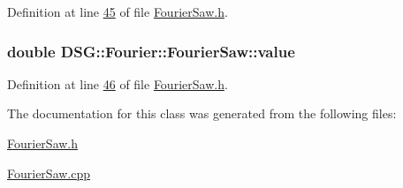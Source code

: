 Definition at line \hyperlink{_fourier_saw_8h_source_l00045}{45} of file \hyperlink{_fourier_saw_8h_source}{Fourier\+Saw.\+h}.

\hypertarget{class_d_s_g_1_1_fourier_1_1_fourier_saw_a97d69a0c03cfb66b1cf6e13fe7073c12}{
\subsubsection[{value}]{\setlength{\rightskip}{0pt plus 5cm}double D\+S\+G\+::\+Fourier\+::\+Fourier\+Saw\+::value\hspace{0.3cm}{\ttfamily [protected]}}}\label{class_d_s_g_1_1_fourier_1_1_fourier_saw_a97d69a0c03cfb66b1cf6e13fe7073c12}


Definition at line \hyperlink{_fourier_saw_8h_source_l00046}{46} of file \hyperlink{_fourier_saw_8h_source}{Fourier\+Saw.\+h}.



The documentation for this class was generated from the following files\+:\begin{DoxyCompactItemize}
\item 
\hyperlink{_fourier_saw_8h}{Fourier\+Saw.\+h}\item 
\hyperlink{_fourier_saw_8cpp}{Fourier\+Saw.\+cpp}\end{DoxyCompactItemize}
